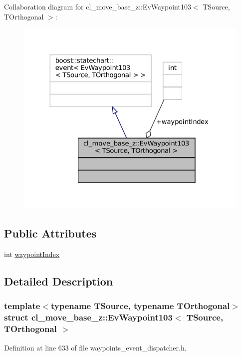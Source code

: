 Collaboration diagram for cl\+\_\+move\+\_\+base\+\_\+z\+:\+:Ev\+Waypoint103$<$ T\+Source, T\+Orthogonal $>$\+:
\nopagebreak
\begin{figure}[H]
\begin{center}
\leavevmode
\includegraphics[width=324pt]{structcl__move__base__z_1_1EvWaypoint103__coll__graph}
\end{center}
\end{figure}
\subsection*{Public Attributes}
\begin{DoxyCompactItemize}
\item 
int \hyperlink{structcl__move__base__z_1_1EvWaypoint103_af6e4fb249e3a1b28647c4680f1f59933}{waypoint\+Index}
\end{DoxyCompactItemize}


\subsection{Detailed Description}
\subsubsection*{template$<$typename T\+Source, typename T\+Orthogonal$>$\newline
struct cl\+\_\+move\+\_\+base\+\_\+z\+::\+Ev\+Waypoint103$<$ T\+Source, T\+Orthogonal $>$}



Definition at line 633 of file waypoints\+\_\+event\+\_\+dispatcher.\+h.



